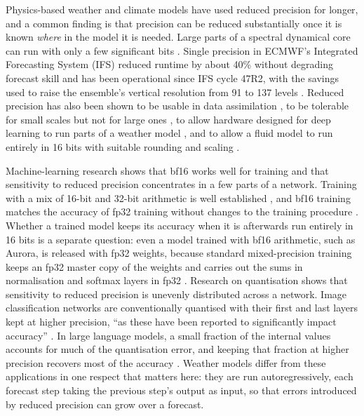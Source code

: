 Physics-based weather and climate models have used reduced precision
for longer, and a common finding is that precision can be reduced
substantially once it is known \emph{where} in the model it is
needed. Large parts of a spectral dynamical core can run with
only a few significant bits \citep{dueben2014benchmark}. Single precision
in ECMWF's Integrated Forecasting System (IFS) reduced runtime by about
40\% without degrading forecast skill \citep{vana2017single} and has
been operational since IFS cycle 47R2, with the savings used to raise
the ensemble's vertical resolution from 91 to 137 levels
\citep{lang2021more}. Reduced precision has also been shown to be usable
in data assimilation \citep{hatfield2018improving}, to be tolerable for
small scales but not for large ones \citep{chantry2019scale}, to allow
hardware designed for deep learning to run parts of a weather model
\citep{hatfield2019accelerating}, and to allow a fluid model to run
entirely in 16 bits with suitable rounding and scaling
\citep{klower2022fluid, paxton2022climate}.

Machine-learning research shows that bf16 works well for training and
that sensitivity to reduced precision concentrates in a few parts of a
network. Training with a mix of 16-bit and 32-bit
arithmetic is well established \citep{micikevicius2018mixed}, and bf16
training matches the accuracy of fp32 training without changes to the
training procedure \citep{kalamkar2019bfloat16}. Whether a trained model
keeps its accuracy when it is afterwards run entirely in 16 bits is a
separate question: even a model trained with bf16 arithmetic, such as
Aurora, is released with fp32 weights, because standard
mixed-precision training keeps an fp32 master copy of the weights and
carries out the sums in normalisation and softmax layers in fp32
\citep{micikevicius2018mixed}. Research on quantisation shows that sensitivity to
reduced precision is unevenly distributed across a network. Image
classification networks are conventionally quantised with their first
and last layers kept at higher precision, ``as these have been reported
to significantly impact accuracy'' \citep{choi2018pact}. In large language
models, a small fraction of the internal values accounts for much of the
quantisation error, and keeping that fraction at higher precision recovers
most of the accuracy \citep{dettmers2022llmint8}. Weather models differ from these applications in one
respect that matters here: they are run autoregressively, each forecast
step taking the previous step's output as input, so that errors
introduced by reduced precision can grow over a forecast.

